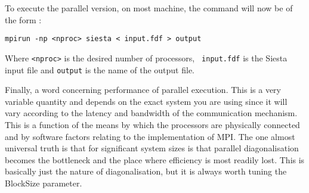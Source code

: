 \documentclass[11pt]{article}
\begin{document}
To execute the parallel version, on most machine, the command will now
be of the form :

{\tt mpirun -np <nproc> siesta < input.fdf > output}

Where {\tt <nproc>} is the desired number of processors, {\tt
input.fdf} is the {\sc Siesta} input file and {\tt output} is the name
of the output file.

Finally, a word concerning performance of parallel execution. This is
a very variable quantity and depends on the exact system you are using
since it will vary according to the latency and bandwidth of the
communication mechanism.  This is a function of the means by which the
processors are physically connected and by software factors relating
to the implementation of MPI. The one almost universal truth is that
for significant system sizes is that parallel diagonalisation becomes
the bottleneck and the place where efficiency is most readily
lost. This is basically just the nature of diagonalisation, but it is
always worth tuning the BlockSize parameter.

\printindex
\end{document}
